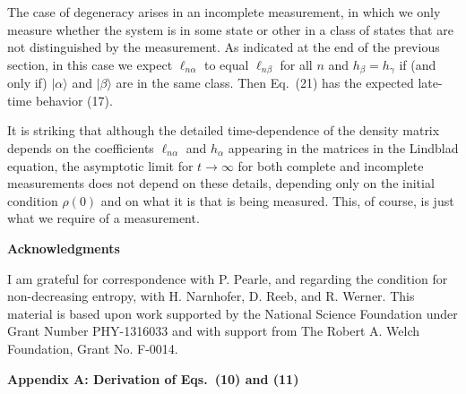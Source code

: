 \documentclass[12pt]{article}
\begin{document}
The case of degeneracy arises in an incomplete measurement, in which  we only measure whether the system is in some state or other in a class  of states that are not distinguished by the measurement.  As indicated at the end of the previous section, in this case we expect $\ell_{n\alpha}$ to equal $\ell_{n\beta}$ for all $n$ and $h_\beta=h_\gamma$ if (and only if) $|\alpha\rangle$ and $|\beta\rangle$ are in the same class.  Then Eq.~(21) has the expected late-time behavior (17).


It is striking that although the detailed time-dependence of the density matrix depends on the coefficients $\ell_{n\alpha}$ and $h_\alpha$ appearing in the matrices in the Lindblad equation, the asymptotic limit for $t\rightarrow\infty$ for both complete and incomplete measurements does not depend on these details, depending only on the initial condition $\rho(0)$ and on what it is that  is being measured.  
This, of course, is just what we require of a measurement. 



\vspace{20pt}

\begin{center}
{\bf Acknowledgments}
\end{center}

I am grateful for correspondence with P. Pearle, and regarding the condition for non-decreasing entropy, with H. Narnhofer,  D. Reeb, and R. Werner.  This material is based upon work supported by the National Science Foundation under Grant Number PHY-1316033 and with support from The Robert A. Welch Foundation, Grant No. F-0014.


\vspace{10pt}

\begin{center}
{\bf Appendix A: Derivation of Eqs.~(10) and (11) }
\end{center}
\renewcommand{\theequation}{A.\arabic{equation}}
\setcounter{equation}{0}
\end{document}
